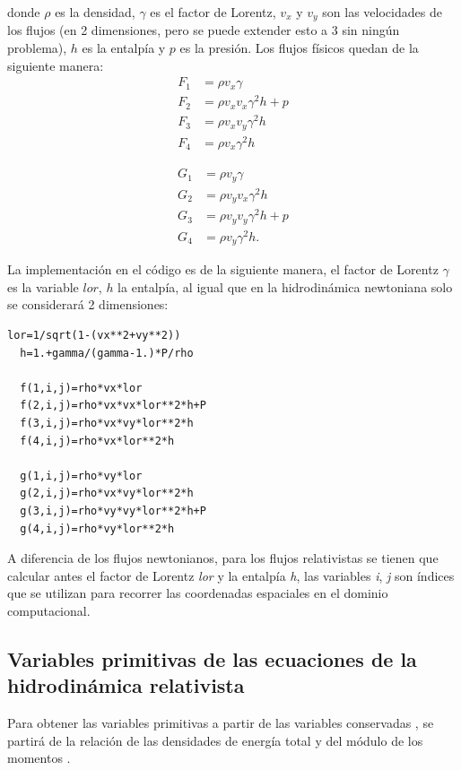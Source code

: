 \documentclass[12pt,a4paper]{book}
\begin{document}
\noindent donde $\rho$ es la densidad, $\gamma$ es el factor de Lorentz, $v_{x}$ y $v_{y}$ son las velocidades de los flujos (en 2 dimensiones, pero se puede extender esto a 3 sin ningún problema), 
$h$ es la entalpía  y $p$ es la presión. Los flujos físicos quedan de la siguiente manera:
\begin{align}
F_{1}& = \rho v_{x} \gamma \\ 
F_{2}& = \rho v_{x} v_{x} \gamma^{2} h + p\\ 
F_{3}& = \rho v_{x} v_{y} \gamma^{2} h \\ 
F_{4}& = \rho v_{x} \gamma^{2} h 
\end{align}

\begin{align}
G_{1}& = \rho v_{y} \gamma \\ 
G_{2}& = \rho v_{y} v_{x} \gamma^{2} h \\ 
G_{3}& = \rho v_{y} v_{y} \gamma^{2} h + p\\ 
G_{4}& = \rho v_{y} \gamma^{2} h .
\end{align}


La implementación en el código es de la siguiente manera, el factor de Lorentz $\gamma$ es la variable $lor$, $h$ la entalpía, al igual que en la hidrodinámica newtoniana solo se considerará 2 dimensiones:

\begin{lstlisting}[frame=single]
  lor=1/sqrt(1-(vx**2+vy**2))
  h=1.+gamma/(gamma-1.)*P/rho
  
  f(1,i,j)=rho*vx*lor
  f(2,i,j)=rho*vx*vx*lor**2*h+P
  f(3,i,j)=rho*vx*vy*lor**2*h
  f(4,i,j)=rho*vx*lor**2*h

  g(1,i,j)=rho*vy*lor
  g(2,i,j)=rho*vx*vy*lor**2*h
  g(3,i,j)=rho*vy*vy*lor**2*h+P
  g(4,i,j)=rho*vy*lor**2*h

\end{lstlisting}

A diferencia de los flujos newtonianos, para los flujos relativistas se tienen que calcular antes el factor de Lorentz \emph{lor} y la entalpía \emph{h},
las variables \emph{i}, \emph{j} son índices que se utilizan para recorrer las coordenadas espaciales en el dominio computacional.

\subsection{Variables primitivas de las ecuaciones de la hidrodinámica relativista} \label{Cap_Desacoplamiento_de_las_ecuaciones_de_la_hidrodinámica_relativista}
Para obtener las variables primitivas a partir de las variables conservadas , se partirá de la relación de las densidades de energía total y del módulo de los momentos \citep{McKinney2007}. 
\end{document}
